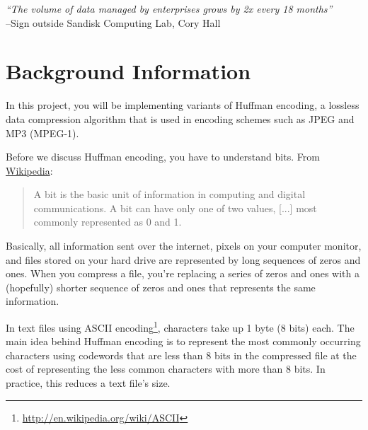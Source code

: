 \documentclass[11pt]{article}
\begin{document}
\maketitle
\let\b\textbf

\begin{center}
\emph{``The volume of data managed by enterprises grows by 2x every 18 months''} \\ --Sign outside Sandisk Computing Lab, Cory Hall
\end{center}

\section*{Background Information}

In this project, you will be implementing variants of Huffman encoding, a lossless data compression algorithm that is used in encoding schemes such as JPEG and MP3 (MPEG-1).

Before we discuss Huffman encoding, you have to understand bits. From \href{http://en.wikipedia.org/wiki/Bit}{\color{blue} Wikipedia}: 
\begin{quotation}
\noindent A bit is the basic unit of information in computing and digital communications. A bit can have only one of two values, [...] most commonly represented as 0 and 1.
\end{quotation}
Basically, all information sent over the internet, pixels on your computer monitor, and files stored on your hard drive are represented by long sequences of zeros and ones. When you compress a file, you're replacing a series of zeros and ones with a (hopefully) shorter sequence of zeros and ones that represents the same information.

In text files using ASCII encoding\footnote{\href{http://en.wikipedia.org/wiki/ASCII}{\color{blue} http://en.wikipedia.org/wiki/ASCII}}, characters take up 1 byte (8 bits) each. The main idea behind Huffman encoding is to represent the most commonly occurring characters using codewords that are less than 8 bits in the compressed file at the cost of representing the less common characters with more than 8 bits. In practice, this reduces a text file's size.
\end{document}
